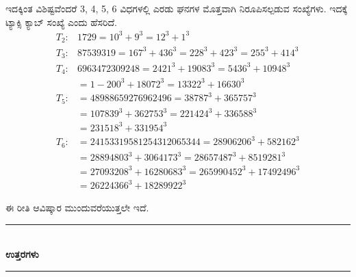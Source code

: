 \begin{enumerate}
ಇದಕ್ಕಿಂತ ವಿಶಿಷ್ಟವೆಂದರೆ 3, 4, 5, 6 ವಿಧಗಳಲ್ಲಿ ಎರಡು ಘನಗಳ ಮೊತ್ತವಾಗಿ ನಿರೂಪಿಸಲ್ಪಡುವ ಸಂಖ್ಯೆಗಳು. ಇದಕ್ಕೆ ಟ್ಯಾಕ್ಸಿ ಕ್ಯಾಬ್ ಸಂಖ್ಯೆ ಎಂದು ಹೆಸರಿದೆ.
\begin{align*}
T_{2} : & 1729 = 10^{3} + 9^{3} = 12^{3} + 1^{3}\\
T_{3} : & 87539319 = 167^{3} + 436^{3} = 228^{3} + 423^{3} = 255^{3} + 414^{3}\\
T_{4} : & 6963472309248 = 2421^{3} + 19083^{3} = 5436^{3} + 10948^{3}\\
& = 1-200^{3} + 18072^{3} = 13322^{3} + 16630^{3}\\
T_{5} : & = 48988659276962496 = 38787^{3} + 365757^{3}\\ 
& = 107839^{3} + 362753^{3} = 221424^{3} + 336588^{3}\\
& = 231518^{3} + 331954^{3}\\
T_{6} : & = 24153319581254312065344= 28906206^{3} + 582162^{3}\\
& = 28894803^{3} + 3064173^{3} = 28657487^{3} + 8519281^{3}\\
& = 27093208^{3} + 16280683^{3} = 265990452^{3} + 17492496^{3}\\
& = 26224366^{3} + 18289922^{3}
\end{align*}

ಈ ರೀತಿ ಆವಿಷ್ಕಾರ ಮುಂದುವರೆಯುತ್ತಲೇ ಇದೆ. 
\end{enumerate}

\smallskip

\begin{center}
\rule{5cm}{1pt}\\[5pt]
{\Large\bfseries ಉತ್ತರಗಳು}\\[3pt]
\rule{5cm}{1pt}
\end{center}

